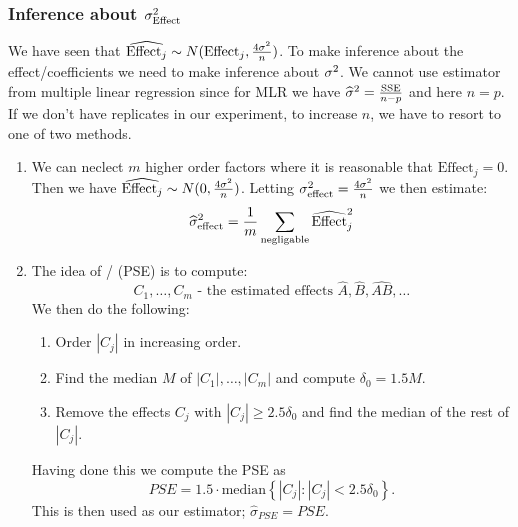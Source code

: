 \subsubsection{Inference about $\sigma^2_{\textrm{Effect}}$}

We have seen that $\widehat{\textrm{Effect}_j} \sim N(\textrm{Effect}_j, \frac{4\sigma^2}{n})$. To make inference about the effect/coefficients we need to make inference about $\sigma^2$. We cannot use estimator from multiple linear regression since for MLR we have $\widehat{\sigma}^2=\frac{\textrm{SSE}}{n-p}$ and here $n=p$. If we don't have replicates in our experiment, to increase $n$, we have to resort to one of two methods.
\begin{enumerate}
    \item We can neclect $m$ higher order factors where it is reasonable that $\textrm{Effect}_j = 0$. Then we have $\widehat{\textrm{Effect}_j} \sim N(0, \frac{4\sigma^2}{n})$. Letting $\sigma^2_{\textrm{effect}} = \frac{4\sigma^2}{n}$ we then estimate:
    $$
        \widehat{\sigma}^2_{\textrm{effect}} = \frac{1}{m} \sum_{\textrm{negligable}} \widehat{\textrm{Effect}}_j^2
    $$

    \item The idea of  /  (PSE) is to compute:
    $$
        C_1, \ldots, C_m \text{ - the estimated effects } \hat{A}, \hat{B}, \hat{AB}, \ldots
    $$  
    We then do the following:
        \begin{enumerate}
            \item Order $|C_j|$ in increasing order.
            \item Find the median $M$ of $|C_1|, \ldots, |C_{m}|$ and compute $\delta_0 = 1.5M$.
            \item Remove the effects $C_j$ with $|C_j| \geq 2.5 \delta_0$ and find the median of the rest of $|C_j|$.
        \end{enumerate}
    Having done this we compute the PSE as 
    $$
        PSE = 1.5 \cdot \text{median} \left\{ |C_j| : |C_j| < 2.5 \delta_0 \right\}.
    $$
    This is then used as our estimator; $\hat{\sigma}_{PSE} = PSE$.
        
\end{enumerate}

